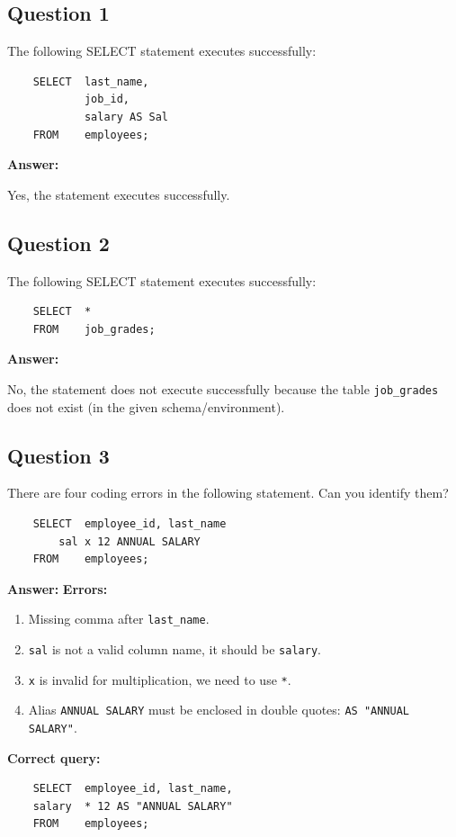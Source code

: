 \documentclass[12pt,a4paper]{article}
\begin{document}
\subsection*{Question 1}
The following SELECT statement executes successfully:
\begin{lstlisting}
    SELECT  last_name,
            job_id,
            salary AS Sal
    FROM    employees;
\end{lstlisting}

\textbf{Answer:} 

Yes, the statement executes successfully.

\subsection*{Question 2}
The following SELECT statement executes successfully:
\begin{lstlisting}
    SELECT  *
    FROM    job_grades;
\end{lstlisting}

\textbf{Answer:}

No, the statement does not execute successfully because the table \texttt{job\_grades} does not exist (in the given schema/environment).

\subsection*{Question 3}
There are four coding errors in the following statement. Can you identify them?
\begin{lstlisting}
    SELECT  employee_id, last_name
        sal x 12 ANNUAL SALARY
    FROM    employees;
\end{lstlisting}

\textbf{Answer:}
    \textbf{Errors:}
        \begin{enumerate}
            \item Missing comma after \texttt{last\_name}.
            \item \texttt{sal} is not a valid column name, it should be \texttt{salary}.
            \item \texttt{x} is invalid for multiplication, we need to use \texttt{*}.
            \item Alias \texttt{ANNUAL SALARY} must be enclosed in double quotes: \texttt{AS "ANNUAL SALARY"}.
        \end{enumerate}

\textbf{Correct query:}
\begin{lstlisting}
    SELECT  employee_id, last_name,
    salary  * 12 AS "ANNUAL SALARY"
    FROM    employees;
\end{lstlisting}
\end{document}

